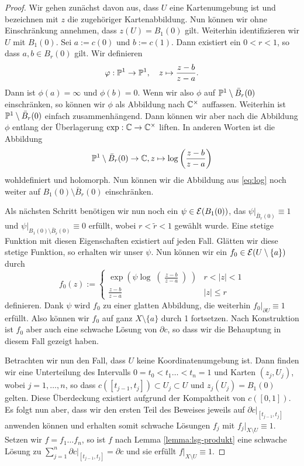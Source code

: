 \begin{proof}
  Wir gehen zunächst davon aus, dass $U$ eine Kartenumgebung ist und
  bezeichnen mit $z$ die zugehöriger Kartenabbildung. Nun können wir
  ohne Einschränkung annehmen, dass $z(U) = B_1(0)$ gilt. Weiterhin
  identifizieren wir $U$ mit $B_1(0)$. Sei $a := c(0)$ und $b :=
  c(1)$. Dann existiert ein $0 < r < 1$, so dass $a, b \in B_r(0)$
  gilt. Wir definieren
  \[
  \phi: \P^1 \ra \P^1, \quad z \mapsto \frac{z-b}{z-a}.
  \]
  Dann ist $\phi(a) = \infty$ und $\phi(b) = 0$. Wenn wir also $\phi$
  auf $\P^1 \setminus \bar B_r(0)$ einschränken, so können wir $\phi$
  als Abbildung nach $\C^\times$ auffassen. Weiterhin ist $\P^1
  \setminus \bar B_r(0)$ einfach zusammenhängend. Dann können wir aber
  nach \cite[Beispiel 4.18]{For} die Abbildung $\phi$ entlang der
  Überlagerung $\exp: \C \ra \C^\times$ liften. In anderen Worten ist
  die Abbildung
  \begin{align}
    \label{eq:log}
  \P^1\setminus \bar B_r(0) \ra \C, z \mapsto \log \left (
    \frac{z-b}{z-a} \right )
  \end{align}
  wohldefiniert und holomorph. Nun können wir die Abbildung aus
  \eqref{eq:log} noch weiter auf $B_1(0) \setminus \bar B_r(0)$
  einschränken.

  Als nächsten Schritt benötigen wir nun noch ein $\psi \in
  \diff(B_1(0))$, das $\psi|_{\bar B_r(0)} \equiv 1$ und $\psi|_{B_1(0)
    \setminus \bar B_{\tilde r}(0)} \equiv 0$ erfüllt, wobei $r <
  \tilde r <1$
  gewählt wurde. Eine stetige Funktion mit diesen Eigenschaften
  existiert auf jeden Fall. Glätten wir diese stetige Funktion, so
  erhalten wir unser $\psi$. Nun können wir ein $f_0 \in \diff(U
  \setminus \{a\})$ durch
  \[
  f_0(z) :=
  \begin{cases}
    \exp \left (\psi \log \middle ( \frac{z-b}{z-a} \middle ) \right
    ) & r < |z| <1 \\
    \frac{z-b}{z-a} & |z| \leq r
  \end{cases}
  \]
  definieren. Dank $\psi$ wird $f_0$ zu einer glatten Abbildung, die
  weiterhin $f_0|_{\partial U} \equiv 1$ erfüllt. Also können wir
  $f_0$ auf ganz $X \setminus \{a\}$ durch 1 fortsetzen. Nach
  Konstruktion ist $f_0$ aber auch eine schwache Lösung von
  $\partial c$, so dass wir die Behauptung in diesem Fall gezeigt
  haben.

  Betrachten wir nun den Fall, dass $U$ keine Koordinatenumgebung
  ist. Dann finden wir eine Unterteilung des Intervalls $0= t_0 <
  t_1 \dots < t_n = 1$ und Karten $(z_j, U_j)$, wobei $j = 1, \dots,
  n$, so dass $c([t_{j-1}, t_j]) \subset U_j \subset U$ und
  $z_j(U_j) = B_1(0)$ gelten. Diese Überdeckung existiert aufgrund
  der Kompaktheit von $c([0,1])$. Es folgt nun aber, dass wir den
  ersten Teil des Beweises jeweils auf $\partial c|_{[t_{j-1},t_j]}$
  anwenden können und erhalten somit schwache Lösungen $f_j$ mit $f_j|_{X
    \setminus U} \equiv 1$.
  Setzen wir $f = f_1 \dots f_n$, so ist $f$ nach Lemma
  \ref{lemma:lsg-produkt} eine schwache Lösung zu
  $\sum_{j=1}^n \partial c|_{[t_{j-1},t_j]} = \partial c$ und sie
  erfüllt $f|_{X \setminus U} \equiv 1$.
\end{proof}


